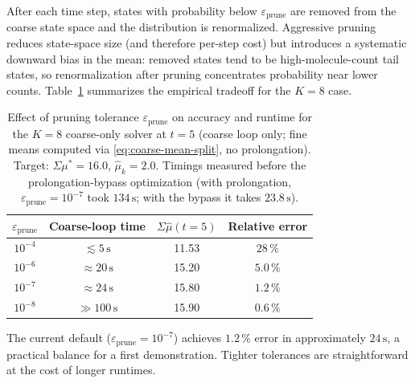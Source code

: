 \documentclass[review,onefignum,onetabnum]{siamart171218}
\begin{document}
\begin{remark}
  \label{rem:prune}
  After each time step, states with probability below
  $\varepsilon_{\mathrm{prune}}$ are removed from the coarse state
  space and the distribution is renormalized.  Aggressive pruning
  reduces state-space size (and therefore per-step cost) but introduces
  a systematic downward bias in the mean: removed states tend to be
  high-molecule-count tail states, so renormalization after pruning
  concentrates probability near lower counts.
  Table~\ref{tab:prune-tradeoff} summarizes the empirical tradeoff
  for the $K = 8$ case.

  \begin{table}[ht]
  \centering
  \caption{Effect of pruning tolerance $\varepsilon_{\mathrm{prune}}$ on
    accuracy and runtime for the $K=8$ coarse-only solver at $t=5$
    (coarse loop only; fine means computed via
    \eqref{eq:coarse-mean-split}, no prolongation).
    Target: $\Sigma\mu^* = 16.0$, $\hat\mu_k = 2.0$.
    Timings measured before the prolongation-bypass optimization
    (with prolongation, $\varepsilon_{\mathrm{prune}} = 10^{-7}$
    took $134\,\mathrm{s}$; with the bypass it takes $23.8\,\mathrm{s}$).}
  \label{tab:prune-tradeoff}
  \begin{tabular}{c|c|c|c}
  \hline
  $\varepsilon_{\mathrm{prune}}$ & Coarse-loop time & $\Sigma\hat\mu(t=5)$ & Relative error \\
  \hline
  $10^{-4}$  & ${\lesssim}5\,\mathrm{s}$    & 11.53 & $28\,\%$ \\
  $10^{-6}$  & ${\approx}20\,\mathrm{s}$   & 15.20 & $5.0\,\%$ \\
  $10^{-7}$  & ${\approx}24\,\mathrm{s}$  & 15.80 & $1.2\,\%$ \\
  $10^{-8}$  & ${\gg}100\,\mathrm{s}$ & 15.90 & $0.6\,\%$ \\
  \hline
  \end{tabular}
  \end{table}

  The current default ($\varepsilon_{\mathrm{prune}} = 10^{-7}$)
  achieves $1.2\,\%$ error in approximately $24\,\mathrm{s}$, a practical
  balance for a first demonstration.  Tighter tolerances are
  straightforward at the cost of longer runtimes.
\end{remark}
\end{document}
